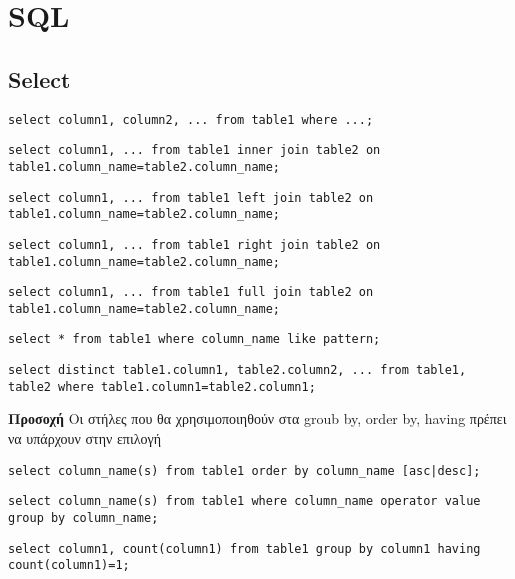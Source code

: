 \section{SQL}

\subsection{Select}

\lstset{language=SQL}

\begin{lstlisting}[caption=select example]
select column1, column2, ... from table1 where ...; 
\end{lstlisting}

\begin{lstlisting}[caption=inner join example]
select column1, ... from table1 inner join table2 on table1.column_name=table2.column_name;
\end{lstlisting}

\begin{lstlisting}[caption=left join example]
select column1, ... from table1 left join table2 on table1.column_name=table2.column_name;
\end{lstlisting}

\begin{lstlisting}[caption=right join example]
select column1, ... from table1 right join table2 on table1.column_name=table2.column_name;
\end{lstlisting}

\begin{lstlisting}[caption=full join example]
select column1, ... from table1 full join table2 on table1.column_name=table2.column_name;
\end{lstlisting}

\begin{lstlisting}[caption=like example]
select * from table1 where column_name like pattern;
\end{lstlisting}

\begin{lstlisting}[caption=distinct example]
select distinct table1.column1, table2.column2, ... from table1, table2 where table1.column1=table2.column1;
\end{lstlisting}

\textbf{Προσοχή} Oι στήλες που θα χρησιμοποιηθούν στα groub by, order by, having πρέπει να υπάρχουν στην επιλογή

\begin{lstlisting}[caption=order by example]
select column_name(s) from table1 order by column_name [asc|desc];
\end{lstlisting}

\begin{lstlisting}[caption=group by example]
select column_name(s) from table1 where column_name operator value group by column_name;
\end{lstlisting}

\begin{lstlisting}[caption=having example]
select column1, count(column1) from table1 group by column1 having count(column1)=1;
\end{lstlisting}
